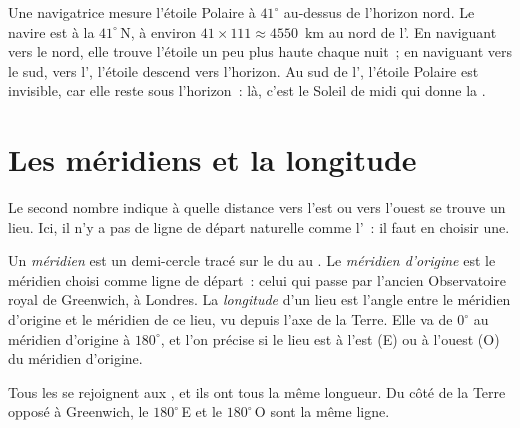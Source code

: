 \begin{example}\label{ex:g6:latitude-longitude:pole-star}
Une navigatrice mesure l'étoile Polaire à $41^\circ$ au-dessus de l'horizon
nord. Le navire est à la  $41^\circ$\,N, à environ $41 \times 111
\approx \num{4550}$~km au nord de l'. En naviguant vers le nord,
elle trouve l'étoile un peu plus haute chaque nuit~; en naviguant vers le
sud, vers l', l'étoile descend vers l'horizon. Au sud de
l', l'étoile Polaire est invisible, car elle reste sous
l'horizon~: là, c'est le Soleil de midi qui donne la .
\end{example}

\section{Les méridiens et la longitude}

Le second nombre indique à quelle distance vers l'est ou vers l'ouest se
trouve un lieu. Ici, il n'y a pas de ligne de départ naturelle comme
l'~: il faut en choisir une.

\begin{definition}\label{def:g6:latitude-longitude:longitude}
Un \emph{méridien} est un demi-cercle tracé sur
le  du  au . Le
\emph{méridien d'origine} est
le méridien choisi comme ligne de départ~: celui qui passe par l'ancien
Observatoire royal de Greenwich, à Londres. La
\emph{longitude} d'un lieu est l'angle entre le méridien
d'origine et le méridien de ce lieu, vu depuis l'axe de la Terre. Elle va
de $0^\circ$ au méridien d'origine à $180^\circ$, et l'on précise si le
lieu est à l'est (E) ou à l'ouest (O) du méridien d'origine.
\end{definition}

Tous les  se rejoignent aux , et ils ont tous la même
longueur. Du côté de la Terre opposé à Greenwich, le 
$180^\circ$\,E et le  $180^\circ$\,O sont la même ligne.

